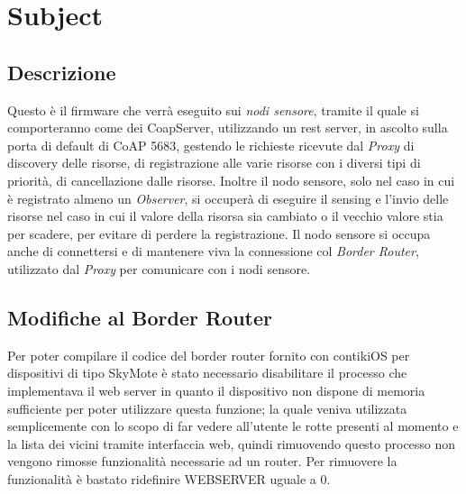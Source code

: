 \chapter{Subject}
  \section{Descrizione}
    Questo è il firmware che verrà eseguito sui \textit{nodi sensore}, tramite il quale si comporteranno come dei CoapServer, utilizzando un rest server, in ascolto sulla porta di default
    di CoAP 5683, gestendo le richieste ricevute dal \textit{Proxy} di discovery delle risorse, di registrazione alle varie risorse con i diversi tipi di priorità, di cancellazione dalle risorse. \newline
    Inoltre il nodo sensore, solo nel caso in cui è registrato almeno un \textit{Observer}, si occuperà di eseguire il sensing e l'invio delle risorse nel caso in cui
    il valore della risorsa sia cambiato o il vecchio valore stia per scadere, per evitare di perdere la registrazione.\newline
    Il nodo sensore si occupa anche di connettersi e di mantenere viva la connessione col \textit{Border Router}, utilizzato dal \textit{Proxy} per comunicare con i nodi sensore.

  \section{Modifiche al Border Router}
    Per poter compilare il codice del border router fornito con contikiOS per dispositivi di tipo SkyMote è stato necessario disabilitare il processo che implementava il web server in quanto il dispositivo non dispone di
    memoria sufficiente per poter utilizzare questa funzione; la quale veniva utilizzata semplicemente con lo scopo di far vedere all'utente le rotte presenti al momento e la lista dei vicini tramite interfaccia web,
    quindi rimuovendo questo processo non vengono rimosse funzionalità necessarie ad un router.\newline
    Per rimuovere la funzionalità è bastato ridefinire WEBSERVER uguale a 0.
    
